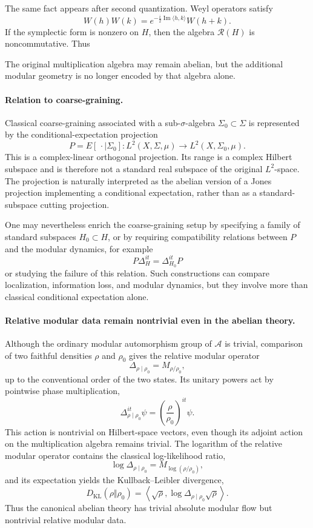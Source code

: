 \documentclass[a4paper,11pt]{article}
\theoremstyle{definition}
\begin{document}
The same fact appears after second quantization. Weyl operators satisfy
\[
    W(h)W(k)
    =e^{-\frac{i}{2}\operatorname{Im}\langle h,k\rangle}W(h+k).
\]
If the symplectic form is nonzero on \(H\), then the algebra \(\mathcal{R}(H)\) is noncommutative. Thus
\begin{center}
\end{center}
The original multiplication algebra may remain abelian, but the additional modular geometry is no longer encoded by that algebra alone.

\paragraph{Relation to coarse-graining.}
Classical coarse-graining associated with a sub-\(\sigma\)-algebra \(\Sigma_0\subset\Sigma\) is represented by the conditional-expectation projection
\[
    P=E[\,\cdot\mid\Sigma_0]:L^2(X,\Sigma,\mu)\to
    L^2(X,\Sigma_0,\mu).
\]
This is a complex-linear orthogonal projection. Its range is a complex Hilbert subspace and is therefore not a standard real subspace of the original \(L^2\)-space. The projection is naturally interpreted as the abelian version of a Jones projection implementing a conditional expectation, rather than as a standard-subspace cutting projection.

One may nevertheless enrich the coarse-graining setup by specifying a family of standard subspaces \(H_0\subset H\), or by requiring compatibility relations between \(P\) and the modular dynamics, for example
\[
    P\Delta_H^{it}=\Delta_{H_0}^{it}P
\]
or studying the failure of this relation. Such constructions can compare localization, information loss, and modular dynamics, but they involve more than classical conditional expectation alone.

\paragraph{Relative modular data remain nontrivial even in the abelian theory.}
Although the ordinary modular automorphism group of \(\mathcal{A}\) is trivial, comparison of two faithful densities \(\rho\) and \(\rho_0\) gives the relative modular operator
\[
    \Delta_{\rho\mid\rho_0}=M_{\rho/\rho_0},
\]
up to the conventional order of the two states. Its unitary powers act by pointwise phase multiplication,
\[
    \Delta_{\rho\mid\rho_0}^{it}\psi
    =\left(\frac{\rho}{\rho_0}\right)^{it}\psi.
\]
This action is nontrivial on Hilbert-space vectors, even though its adjoint action on the multiplication algebra remains trivial. The logarithm of the relative modular operator contains the classical log-likelihood ratio,
\[
    \log\Delta_{\rho\mid\rho_0}
    =M_{\log(\rho/\rho_0)},
\]
and its expectation yields the Kullback--Leibler divergence,
\[
    D_{\mathrm{KL}}(\rho\Vert\rho_0)
    =\left\langle\sqrt\rho,
    \log\Delta_{\rho\mid\rho_0}\sqrt\rho\right\rangle.
\]
Thus the canonical abelian theory has trivial absolute modular flow but nontrivial relative modular data.
\end{document}
